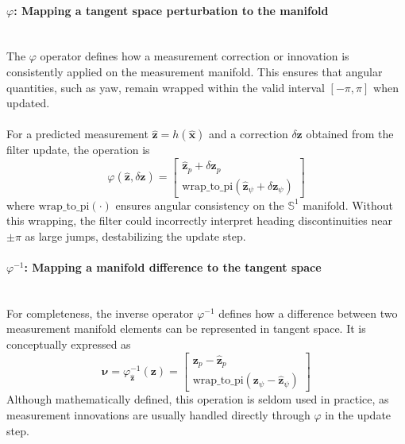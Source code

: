 \paragraph{$\varphi$: Mapping a tangent space perturbation to the manifold} \mbox{}\\[0.5em] \noindent
The $\varphi$ operator defines how a measurement correction or innovation is consistently applied on the measurement manifold. This ensures that angular quantities, such as yaw, remain wrapped within the valid interval $[-\pi, \pi]$ when updated.  
\\ \\
For a predicted measurement $\hat{\mathbf{z}} = h(\hat{\mathbf{x}})$ and a correction $\delta\mathbf{z}$ obtained from the filter update, the operation is
$$
    \varphi(\hat{\mathbf{z}}, \delta\mathbf{z}) =
    \begin{bmatrix}
        \hat{\mathbf{z}}_p + \delta\mathbf{z}_p \\
        \mathrm{wrap\_to\_pi}(\hat{\mathbf{z}}_\psi + \delta\mathbf{z}_\psi)
    \end{bmatrix}
$$
where $\mathrm{wrap\_to\_pi}(\cdot)$ ensures angular consistency on the $\mathbb{S}^1$ manifold. Without this wrapping, the filter could incorrectly interpret heading discontinuities near $\pm\pi$ as large jumps, destabilizing the update step.  

\paragraph{$\varphi^{-1}$: Mapping a manifold difference to the tangent space} \mbox{}\\[0.5em] \noindent
For completeness, the inverse operator $\varphi^{-1}$ defines how a difference between two measurement manifold elements can be represented in tangent space. It is conceptually expressed as
$$
    \boldsymbol{\nu} = \varphi^{-1}_{\hat{\mathbf{z}}}(\mathbf{z}) =
    \begin{bmatrix}
        \mathbf{z}_p - \hat{\mathbf{z}}_p \\
        \mathrm{wrap\_to\_pi}(\mathbf{z}_\psi - \hat{\mathbf{z}}_\psi)
    \end{bmatrix}
$$
Although mathematically defined, this operation is seldom used in practice, as measurement innovations are usually handled directly through $\varphi$ in the update step.

